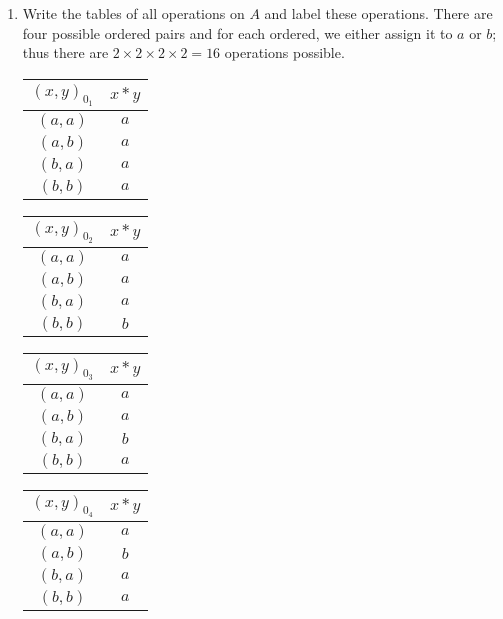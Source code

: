 \documentclass[nohyper,nobib]{tufte-handout}
\theoremstyle{definition}
\theoremstyle{remark}
\begin{document}
\begin{enumerate}
    \item Write the tables of all operations on $A$ and label these operations. There are four possible ordered pairs and for each ordered, we either assign it to $a$ or $b$; thus there are $2 \times 2 \times 2 \times 2 = 16$ operations possible.

        \begin{table}[h]
            \begin{tabular}{@{}c|c@{}}
                $(x, y)_{0_{1}}$ & $x * y$ \\
                \midrule
                $(a, a)$ & $a$ \\
                $(a, b)$ & $a$ \\
                $(b, a)$ & $a$ \\
                $(b, b)$ & $a$
            \end{tabular}
            \qquad 
            \begin{tabular}{@{}c|c@{}}
                $(x, y)_{0_{2}}$ & $x * y$ \\
                \midrule
                $(a, a)$ & $a$ \\
                $(a, b)$ & $a$ \\
                $(b, a)$ & $a$ \\
                $(b, b)$ & $b$
            \end{tabular}
            \qquad
            \begin{tabular}{@{}c|c@{}}
                $(x, y)_{0_{3}}$ & $x * y$ \\
                \midrule
                $(a, a)$ & $a$ \\
                $(a, b)$ & $a$ \\
                $(b, a)$ & $b$ \\
                $(b, b)$ & $a$
            \end{tabular}
            \qquad
            \begin{tabular}{@{}c|c@{}}
                $(x, y)_{0_{4}}$ & $x * y$ \\
                \midrule
                $(a, a)$ & $a$ \\
                $(a, b)$ & $b$ \\
                $(b, a)$ & $a$ \\
                $(b, b)$ & $a$
            \end{tabular}
        \end{table}%

\end{enumerate}
\end{document}
